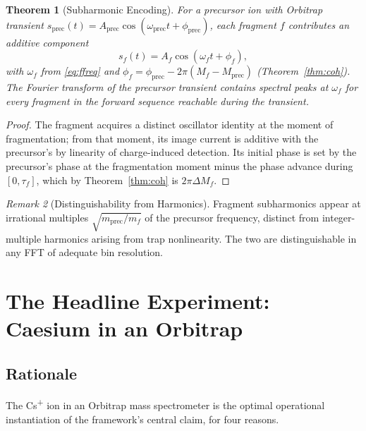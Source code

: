 \documentclass[twocolumn,10pt,a4paper]{article}
\theoremstyle{thmstyle}
\newtheorem{theorem}{Theorem}[section]
\theoremstyle{definition}
\theoremstyle{remark}
\newtheorem{remark}[theorem]{Remark}
\begin{document}
\begin{theorem}[Subharmonic Encoding]
\label{thm:sub}
For a precursor ion with Orbitrap transient
$s_{\mathrm{prec}}(t)=A_{\mathrm{prec}}\cos(\omega_{\mathrm{prec}}t+\phi_{\mathrm{prec}})$,
each fragment $f$ contributes an additive component
\begin{equation}
s_{f}(t)=A_{f}\cos(\omega_{f}t+\phi_{f}),
\label{eq:sub}
\end{equation}
with $\omega_{f}$ from \eqref{eq:ffreq} and
$\phi_{f}=\phi_{\mathrm{prec}}-2\pi(M_{f}-M_{\mathrm{prec}})$
(Theorem~\ref{thm:coh}). The Fourier transform of the precursor
transient contains spectral peaks at $\omega_{f}$ for every fragment
in the forward sequence reachable during the transient.
\end{theorem}

\begin{proof}
The fragment acquires a distinct oscillator identity at the moment of
fragmentation; from that moment, its image current is additive with
the precursor's by linearity of charge-induced detection. Its initial
phase is set by the precursor's phase at the fragmentation moment
minus the phase advance during $[0,\tau_{f}]$, which by
Theorem~\ref{thm:coh} is $2\pi\Delta M_{f}$.
\end{proof}

\begin{remark}[Distinguishability from Harmonics]
\label{rem:harm}
Fragment subharmonics appear at irrational multiples
$\sqrt{m_{\mathrm{prec}}/m_{f}}$ of the precursor frequency, distinct
from integer-multiple harmonics arising from trap nonlinearity. The
two are distinguishable in any FFT of adequate bin resolution.
\end{remark}

\section{The Headline Experiment: Caesium in an Orbitrap}
\label{sec:experiment}

\subsection{Rationale}

The Cs\textsuperscript{+} ion in an Orbitrap mass spectrometer is the
optimal operational instantiation of the framework's central claim,
for four reasons.
\end{document}
